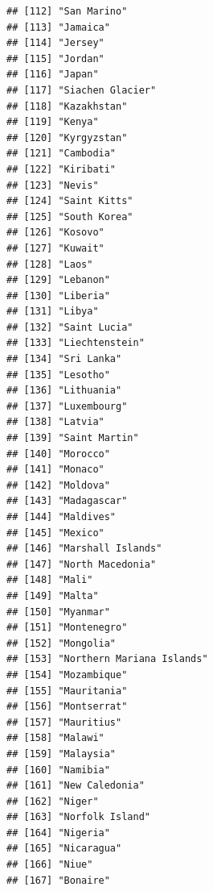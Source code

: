 \documentclass[
]{article}
\begin{document}
\begin{verbatim}
## [112] "San Marino"                         
## [113] "Jamaica"                            
## [114] "Jersey"                             
## [115] "Jordan"                             
## [116] "Japan"                              
## [117] "Siachen Glacier"                    
## [118] "Kazakhstan"                         
## [119] "Kenya"                              
## [120] "Kyrgyzstan"                         
## [121] "Cambodia"                           
## [122] "Kiribati"                           
## [123] "Nevis"                              
## [124] "Saint Kitts"                        
## [125] "South Korea"                        
## [126] "Kosovo"                             
## [127] "Kuwait"                             
## [128] "Laos"                               
## [129] "Lebanon"                            
## [130] "Liberia"                            
## [131] "Libya"                              
## [132] "Saint Lucia"                        
## [133] "Liechtenstein"                      
## [134] "Sri Lanka"                          
## [135] "Lesotho"                            
## [136] "Lithuania"                          
## [137] "Luxembourg"                         
## [138] "Latvia"                             
## [139] "Saint Martin"                       
## [140] "Morocco"                            
## [141] "Monaco"                             
## [142] "Moldova"                            
## [143] "Madagascar"                         
## [144] "Maldives"                           
## [145] "Mexico"                             
## [146] "Marshall Islands"                   
## [147] "North Macedonia"                    
## [148] "Mali"                               
## [149] "Malta"                              
## [150] "Myanmar"                            
## [151] "Montenegro"                         
## [152] "Mongolia"                           
## [153] "Northern Mariana Islands"           
## [154] "Mozambique"                         
## [155] "Mauritania"                         
## [156] "Montserrat"                         
## [157] "Mauritius"                          
## [158] "Malawi"                             
## [159] "Malaysia"                           
## [160] "Namibia"                            
## [161] "New Caledonia"                      
## [162] "Niger"                              
## [163] "Norfolk Island"                     
## [164] "Nigeria"                            
## [165] "Nicaragua"                          
## [166] "Niue"                               
## [167] "Bonaire"                            

\end{verbatim}
\end{document}
